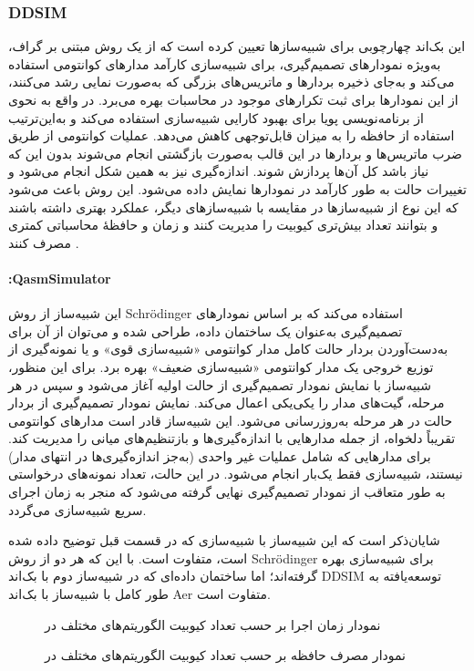 \subsubsection{DDSIM}
این بک‌اند چهارچوبی برای شبیه‌سازها تعیین کرده است که از یک روش مبتنی بر گراف، به‌ویژه نمودارهای تصمیم‌گیری، برای شبیه‌سازی کارآمد مدارهای کوانتومی استفاده می‌کند و به‌جای ذخیره بردارها و ماتریس‌های بزرگی که به‌صورت نمایی رشد می‌کنند، از این نمودارها برای ثبت تکرارهای موجود در محاسبات بهره می‌برد. در واقع به نحوی از برنامه‌نویسی پویا برای بهبود کارایی شبیه‌سازی استفاده می‌کند و به‌این‌ترتیب استفاده از حافظه را به میزان قابل‌توجهی کاهش می‌دهد. عملیات کوانتومی از طریق ضرب ماتریس‌ها و بردارها در این قالب به‌صورت بازگشتی انجام می‌شوند بدون این که نیاز باشد کل آن‌ها پردازش شوند. اندازه‌گیری نیز به همین شکل انجام می‌شود و تغییرات حالت به طور کارآمد در نمودارها نمایش داده می‌شود. این روش باعث می‌شود که این نوع از شبیه‌سازها در مقایسه با شبیه‌سازهای دیگر، عملکرد بهتری داشته باشند و بتوانند تعداد بیش‌تری کیوبیت را مدیریت کنند و زمان و حافظهٔ محاسباتی کمتری مصرف کنند 
\cite{zulehner_advanced_2019}.
\paragraph{:QasmSimulator}
این شبیه‌ساز از روش Schrödinger استفاده می‌کند که بر اساس نمودارهای تصمیم‌گیری به‌عنوان یک ساختمان داده، طراحی شده و می‌توان از آن برای به‌دست‌آوردن بردار حالت کامل مدار کوانتومی «شبیه‌سازی قوی» 
\cite{zulehner_advanced_2019}
و یا نمونه‌گیری از توزیع خروجی یک مدار کوانتومی «شبیه‌سازی ضعیف» 
\cite{hillmich_just_2020}
بهره برد. برای این منظور، شبیه‌ساز با نمایش نمودار تصمیم‌گیری از حالت اولیه آغاز می‌شود و سپس در هر مرحله، گیت‌های مدار را یکی‌یکی اعمال می‌کند. نمایش نمودار تصمیم‌گیری از بردار حالت در هر مرحله به‌روزرسانی می‌شود. این شبیه‌ساز قادر است مدارهای کوانتومی تقریباً دلخواه، از جمله مدارهایی با اندازه‌گیری‌ها و بازتنظیم‌های میانی را مدیریت کند. برای مدارهایی که شامل عملیات غیر واحدی (به‌جز اندازه‌گیری‌ها در انتهای مدار) نیستند، شبیه‌سازی فقط یک‌بار انجام می‌شود. در این حالت، تعداد نمونه‌های درخواستی به طور متعاقب از نمودار تصمیم‌گیری نهایی گرفته می‌شود که منجر به زمان اجرای سریع شبیه‌سازی می‌گردد.

شایان‌ذکر است که این شبیه‌ساز با شبیه‌سازی که در قسمت قبل توضیح داده شده است، متفاوت است. با این که هر دو از روش Schrödinger برای شبیه‌سازی بهره گرفته‌اند؛ اما ساختمان داده‌ای که در شبیه‌ساز دوم با بک‌اند DDSIM توسعه‌یافته به طور کامل با شبیه‌ساز با بک‌اند Aer متفاوت است.

\begin{figure}
	\centering
	\captionsetup{justification=centering}
	
	\caption{
		نمودار زمان اجرا بر حسب تعداد کیوبیت الگوریتم‌های مختلف در
		}
	\label{fig:7}
	\vspace{2cm}
	\captionsetup{justification=centering}
	
	\caption{
		نمودار مصرف حافظه بر حسب تعداد کیوبیت الگوریتم‌های مختلف در
		}
	\label{fig:8}
\end{figure}

